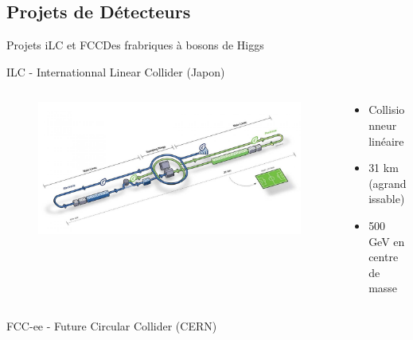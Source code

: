 \documentclass[9pt]{beamer}
\begin{document}
\subsection{Projets de Détecteurs}
\begin{frame}{Projets iLC et FCC}{Des frabriques à bosons de Higgs}

    \begin{block}{ILC - Internationnal Linear Collider (Japon)}
        \begin{columns}
		
            \begin{column}{0.45\textwidth}
                    \begin{figure}
                        \includegraphics[width=\textwidth]{../img/ilc.jpg}
                    \end{figure}
            \end{column}
        
            \begin{column}{0.45\textwidth}
                    \begin{itemize}
                    \item Collisionneur linéaire 
                    \item 31 km (agrandissable)
                    \item 500 GeV en centre de masse
                \end{itemize}
            \end{column}
        
        \end{columns}
    \end{block}
    
    \begin{block}{FCC-ee - Future Circular Collider (CERN)}
        \begin{columns}
        

\end{columns}
\end{block}
\end{frame}
\end{document}

